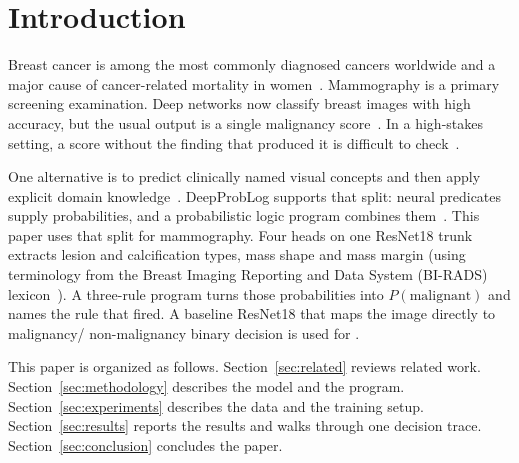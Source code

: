 \section{Introduction}
\label{sec:introduction}

Breast cancer is among the most commonly diagnosed cancers worldwide and a major cause of cancer-related mortality in women~\cite{sung2021global}. Mammography is a primary screening examination. Deep networks now classify breast images with high accuracy, but the usual output is a single malignancy score~\cite{litjens2017survey,balkenende2022application}. In a high-stakes setting, a score without the finding that produced it is difficult to check~\cite{rudin2019stop,vandervelden2022xai}.

One alternative is to predict clinically named visual concepts and then apply explicit domain knowledge~\cite{koh2020concept}. DeepProbLog supports that split: neural predicates supply probabilities, and a probabilistic logic program combines them~\cite{manhaeve2018deepproblog,manhaeve2021neural}. This paper uses that split for mammography. Four heads on one ResNet18 trunk extracts lesion and calcification types, mass shape and mass margin (using terminology from the Breast Imaging Reporting and Data System (BI-RADS) lexicon~\cite{acr2013birads}). A three-rule program turns those probabilities into $P(\mathrm{malignant})$ and names the rule that fired. A baseline ResNet18 that maps the image directly to malignancy/ non-malignancy binary decision is used for .

This paper is organized as follows. Section~\ref{sec:related} reviews related work. Section~\ref{sec:methodology} describes the model and the program. Section~\ref{sec:experiments} describes the data and the training setup. Section~\ref{sec:results} reports the results  and walks through one decision trace. Section~\ref{sec:conclusion} concludes the paper.
